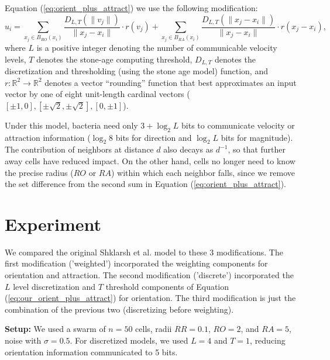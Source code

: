 \documentclass{article}
\newcommand{\inv}{^{-1}}                            %
\newcommand{\R}{\mathbb{R}}                         %
\begin{document}
Equation (\ref{eq:orient_plus_attract}) we use the following modification:
\begin{equation}
u_i = \sum_{x_j \in B_{RO}(x_i)} \frac{D_{L,T}(\|v_j\|)}{\|x_j - x_i\|}
                                \cdot r\left( v_j \right)
    + \sum_{x_j \in B_{RA}(x_i)} \frac{D_{L,T}(\|x_j - x_i\|)}{\|x_j - x_i\|}
                                \cdot r\left( x_j - x_i \right),
\label{eq:our_orient_plus_attract}
\end{equation}
where $L$ is a positive integer denoting the number of communicable velocity
levels, $T$ denotes the stone-age computing threshold, $D_{L,T}$ denotes the
discretization and thresholding (using the stone age model) function, and
$r : \R^2 \to \R^2$ denotes a vector ``rounding'' function that best
approximates an input vector by one of eight unit-length cardinal vectors
($[\pm1,0],[\pm\sqrt2,\pm\sqrt2],[0,\pm1]$).

Under this model, bacteria need only $3 + \log_2 L$ bits to communicate
velocity or attraction information ($\log_2 8$ bits for direction and
$\log_2 L$ bits for magnitude). The contribution of neighbors at distance $d$
also decays as $d\inv$, so that further away cells have reduced impact. On the
other hand, cells no longer need to know the precise radius ($RO$ or $RA$)
within which each neighbor falls, since we remove the set difference from the
second sum in Equation (\ref{eq:orient_plus_attract}).

\section*{Experiment}
We compared the original Shklarsh et al. model
to these 3 modifications. The first modification ('weighted') incorporated the 
weighting components for orientation and attraction. The second modification
('discrete') incorporated the $L$ level discretization and $T$ threshold
components of Equation (\ref{eq:our_orient_plus_attract}) for orientation. The
third modification is just the combination of the previous two (discretizing
before weighting). 

{\bf Setup:}
We used a swarm of $n = 50$ cells, radii $RR = 0.1$, $RO = 2$, and $RA = 5$,
noise with $\sigma = 0.5$. For discretized models, we used $L = 4$ and $T = 1$,
reducing orientation information communicated to 5 bits.
\end{document}

